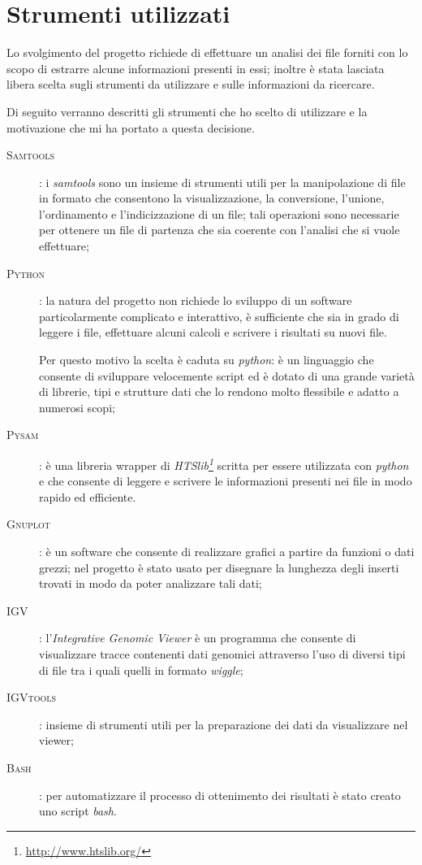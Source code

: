 \clearpage
\section{Strumenti utilizzati}
Lo svolgimento del progetto richiede di effettuare un analisi dei file  forniti con lo scopo di estrarre alcune informazioni presenti in essi; inoltre è stata lasciata libera scelta sugli strumenti da utilizzare e sulle informazioni da ricercare.

Di seguito verranno descritti gli strumenti che ho scelto di utilizzare e la motivazione che mi ha portato a questa decisione.

\begin{description}
\item[\textsc{Samtools}]: i \emph{samtools} sono un insieme di strumenti utili per la manipolazione di file in formato  che consentono la visualizzazione, la conversione, l'unione, l'ordinamento e l'indicizzazione di un file; tali operazioni sono necessarie per ottenere un file di partenza che sia coerente con l'analisi che si vuole effettuare;
\item[\textsc{Python}]: la natura del progetto non richiede lo sviluppo di un software particolarmente complicato e interattivo, è sufficiente che sia in grado di leggere i file, effettuare alcuni calcoli e scrivere i risultati su nuovi file.

Per questo motivo la scelta è caduta su \emph{python}: è un linguaggio che consente di sviluppare velocemente script ed è dotato di una grande varietà di librerie, tipi e strutture dati che lo rendono molto flessibile e adatto a numerosi scopi;
\item[\textsc{Pysam}]: è una libreria wrapper di \emph{HTSlib\footnote{\url{http://www.htslib.org/}}} scritta per essere utilizzata con \emph{python} e che consente di leggere e scrivere le informazioni presenti nei  file in modo rapido ed efficiente.
\item[\textsc{Gnuplot}]: è un software che consente di realizzare grafici a partire da funzioni o dati grezzi; nel progetto è stato usato per disegnare la lunghezza degli inserti trovati in modo da poter analizzare tali dati;
\item[\textsc{IGV}]: l'\emph{Integrative Genomic Viewer} è un programma che consente di visualizzare tracce contenenti dati genomici attraverso l'uso di diversi tipi di file tra i quali quelli in formato \emph{wiggle};
\item[\textsc{IGVtools}]: insieme di strumenti utili per la preparazione dei dati da visualizzare nel viewer;
\item[\textsc{Bash}]: per automatizzare il processo di ottenimento dei risultati è stato creato uno script \emph{bash}.
\end{description}